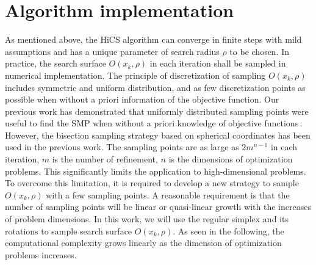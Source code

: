 \documentclass[final,1p,times]{elsarticle}
\begin{document}
\section{Algorithm implementation}
\label{sec:implement}

As mentioned above, the HiCS algorithm can converge in  
finite steps with mild assumptions and has a unique parameter of
search radius $\rho$ to be chosen.
In practice, the search surface $O(x_k,\rho)$ in each iteration
shall be sampled in numerical implementation.
The principle of discretization of sampling $O(x_k,\rho)$
includes symmetric and uniform distribution, and as few
discretization points as possible when without a priori
information of the objective function.
Our previous work has demonstrated that uniformly distributed
sampling points were useful to find the SMP when
without a priori knowledge of objective functions\,\cite{huang2017hill}. 
However, the bisection sampling strategy based
on spherical coordinates has been used in the
previous work. The sampling points are as large as $2m^{n-1}$ in each iteration, $m$
is the number of refinement, $n$ is the dimensions of
optimization problems. This significantly limits the
application to high-dimensional problems. 
To overcome this limitation, it is required to develop a new
strategy to sample $O(x_k,\rho)$ with a few sampling points.
A reasonable requirement is that the number of sampling points will be
linear or quasi-linear growth with the increases of problem dimensions.
In this work, we will use the regular simplex and its rotations to
sample search surface $O(x_k,\rho)$. As seen in the following,
the computational complexity grows linearly as the
dimension of optimization problems increases.
\end{document}
